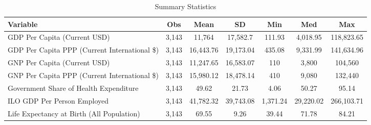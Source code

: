 \begin{table}
\centering
\caption{Summary Statistics}
\label{Sum_Stats}
\begin{tabular}{lcccccc}
\toprule
                                    Variable &   Obs &      Mean &        SD &      Min &       Med &        Max \\
\midrule
GDP Per Capita (Current USD) & 3,143 & 11,764 & 17,582.7 & 111.93 & 4,018.95 & 118,823.65 \\
GDP Per Capita PPP (Current International \$) & 3,143 & 16,443.76 & 19,173.04 & 435.08 & 9,331.99 & 141,634.96 \\
GNP Per Capita (Current USD) & 3,143 & 11,247.65 & 16,583.07 & 110 & 3,800 & 104,560 \\
GNP Per Capita PPP (Current International \$) & 3,143 & 15,980.12 & 18,478.14 & 410 & 9,080 & 132,440 \\
Government Share of Health Expenditure & 3,143 & 49.62 & 21.73 & 4.06 & 50.27 & 95.14 \\
ILO GDP Per Person Employed & 3,143 & 41,782.32 & 39,743.08 & 1,371.24 & 29,220.02 & 266,103.71 \\
Life Expectancy at Birth (All Population) & 3,143 & 69.55 & 9.26 & 39.44 & 71.78 & 84.21 \\
\bottomrule
\end{tabular}
\end{table}
